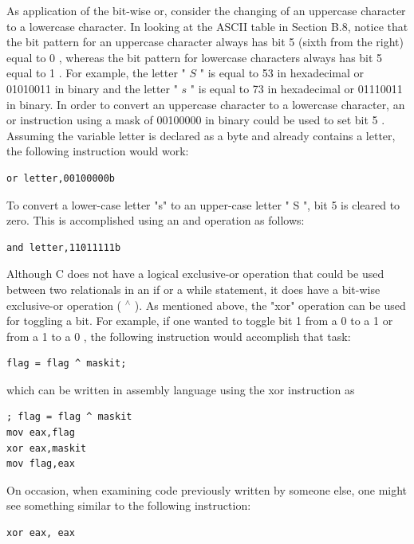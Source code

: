 \documentclass[10pt]{book}
\begin{document}
As application of the bit-wise or, consider the changing of an uppercase character to a lowercase character. In looking at the ASCII table in Section B.8, notice that the bit pattern for an uppercase character always has bit 5 (sixth from the right) equal to 0 , whereas the bit pattern for lowercase characters always has bit 5 equal to 1 . For example, the letter " $S$ " is equal to 53 in hexadecimal or 01010011 in binary and the letter " $s$ " is equal to 73 in hexadecimal or 01110011 in binary. In order to convert an uppercase character to a lowercase character, an or instruction using a mask of 00100000 in binary could be used to set bit 5 . Assuming the variable letter is declared as a byte and already contains a letter, the following instruction would work:

\begin{verbatim}
or letter,00100000b
\end{verbatim}

To convert a lower-case letter "s" to an upper-case letter " S ", bit 5 is cleared to zero. This is accomplished using an and operation as follows:

\begin{verbatim}
and letter,11011111b
\end{verbatim}

Although C does not have a logical exclusive-or operation that could be used between two relationals in an if or a while statement, it does have a bit-wise exclusive-or operation ( ${ }^{\wedge}$ ). As mentioned above, the "xor" operation can be used for toggling a bit. For example, if one wanted to toggle bit 1 from a 0 to a 1 or from a 1 to a 0 , the following instruction would accomplish that task:

\begin{verbatim}
flag = flag ^ maskit;
\end{verbatim}

which can be written in assembly language using the xor instruction as


\begin{verbatim}
; flag = flag ^ maskit
mov eax,flag
xor eax,maskit
mov flag,eax
\end{verbatim}

On occasion, when examining code previously written by someone else, one might see something similar to the following instruction:

\begin{verbatim}
xor eax, eax
\end{verbatim}
\end{document}
